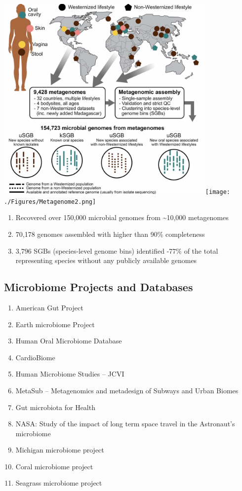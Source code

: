 \documentclass[
]{book}
\providecommand{\tightlist}{%
  \setlength{\itemsep}{0pt}\setlength{\parskip}{0pt}}
\begin{document}
\includegraphics[width=0.8\textwidth,height=\textheight]{./Figures/Metagenome.png}
\texttt{[image: ./Figures/Metagenome2.png]}

\begin{enumerate}
\def\labelenumi{\arabic{enumi}.}
\item
  Recovered over 150,000 microbial genomes from \textasciitilde10,000 metagenomes
\item
  70,178 genomes assembled with higher than 90\% completeness
\item
  3,796 SGBs (species-level genome bins) identified -77\% of the total representing species without any publicly available genomes
\end{enumerate}

\hypertarget{microbiome-projects-and-databases}{%
\subsection{Microbiome Projects and Databases}\label{microbiome-projects-and-databases}}

\begin{enumerate}
\def\labelenumi{\arabic{enumi}.}
\tightlist
\item
  American Gut Project
\item
  Earth microbiome Project
\item
  Human Oral Microbiome Database
\item
  CardioBiome
\item
  Human Microbiome Studies -- JCVI
\item
  MetaSub -- Metagenomics and metadesign of Subways and Urban Biomes
\item
  Gut microbiota for Health
\item
  NASA: Study of the impact of long term space travel in the Astronaut's
  microbiome
\item
  Michigan microbiome project
\item
  Coral microbiome project
\item
  Seagrass microbiome project
\end{enumerate}
\end{document}
